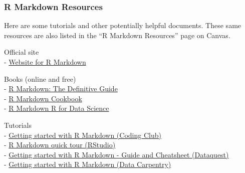 \documentclass[
]{article}
\begin{document}
\subsubsection{\texorpdfstring{\textbf{R Markdown
Resources}}{R Markdown Resources}}\label{r-markdown-resources}

Here are some tutorials and other potentially helpful documents. These
same resources are also listed in the ``R Markdown Resources'' page on
Canvas.

Official site\\
- \href{https://rmarkdown.rstudio.com}{Website for R Markdown}

Books (online and free)\\
- \href{https://bookdown.org/yihui/rmarkdown}{R Markdown: The Definitive
Guide}\\
- \href{https://bookdown.org/yihui/rmarkdown-cookbook}{R Markdown
Cookbook}\\
- \href{https://r4ds.had.co.nz/r-markdown.html}{R Markdown \textbar{} R
for Data Science}

Tutorials\\
- \href{https://ourcodingclub.github.io/tutorials/rmarkdown}{Getting
started with R Markdown (Coding Club)}\\
- \href{https://rmarkdown.rstudio.com/authoring_quick_tour.html}{R
Markdown quick tour (RStudio)}\\
-
\href{https://www.dataquest.io/blog/r-markdown-guide-cheatsheet}{Getting
started with R Markdown - Guide and Cheatsheet (Dataquest)}\\
- \href{https://datacarpentry.org/r-socialsci/06-rmarkdown.html}{Getting
started with R Markdown (Data Carpentry)}
\end{document}

